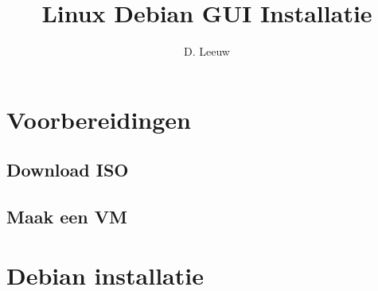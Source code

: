 \documentclass[a4paper,12pt,twoside,openright,titlepage]{article}
\author{D. Leeuw}
\title{Linux Debian GUI Installatie}
\date{\today\\
0.5.2\\
\vfill
\raggedright
\copyright\ 2020-2026 Dennis Leeuw\\
}
\begin{document}

\maketitle


%
%


\section{Voorbereidingen}
\subsection{Download ISO}

\subsection{Maak een VM}


\section{Debian installatie}


\printindex
\end{document}

